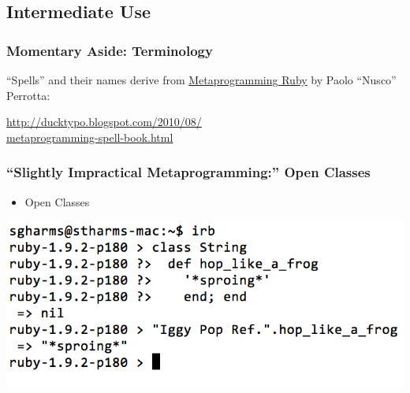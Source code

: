 \documentclass[slidestop,compress,mathserif]{beamer}
\begin{document}
\subsection{Intermediate Use} %
\label{sub:intermediate_use}

\begin{frame}
	\frametitle{Momentary Aside: Terminology}
	``Spells'' and their names derive from \underline{Metaprogramming Ruby} by Paolo ``Nusco'' Perrotta:
	\vskip 0.5cm
	\begin{center}
		\underline{http://ducktypo.blogspot.com/2010/08/} \\
		\underline{metaprogramming-spell-book.html}
	\end{center}
\end{frame}

\begin{frame}
	\frametitle{``Slightly Impractical Metaprogramming:''  Open Classes}
	\begin{itemize}
		\item Open Classes
	\end{itemize}
		\includegraphics[scale=0.42]{img/open_class.png}
\end{frame}
\end{document}
